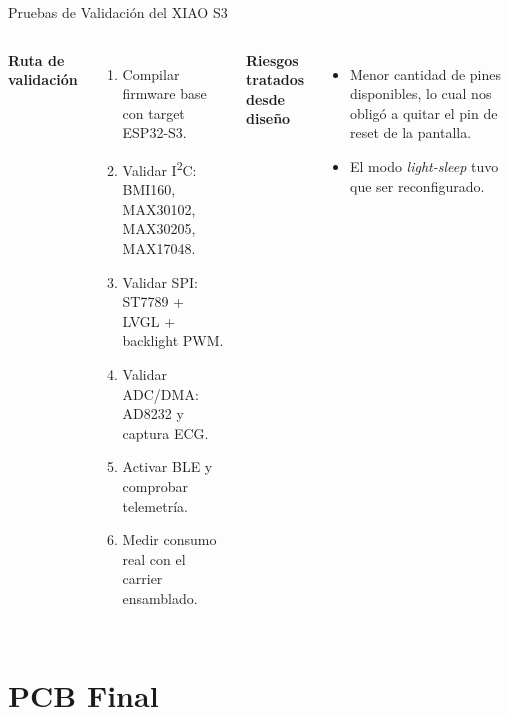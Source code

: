\documentclass[aspectratio=169, 10pt]{beamer}
\begin{document}
\begin{frame}{Pruebas de Validación del XIAO S3}
    \begin{columns}[T]
        \footnotesize
        \textbf{Ruta de validaci\'on}
        \begin{enumerate}\itemsep0.12cm
            \item Compilar firmware base con target ESP32-S3.
            \item Validar I\textsuperscript{2}C: BMI160, MAX30102, MAX30205, MAX17048.
            \item Validar SPI: ST7789 + LVGL + backlight PWM.
            \item Validar ADC/DMA: AD8232 y captura ECG.
            \item Activar BLE y comprobar telemetr\'ia.
            \item Medir consumo real con el carrier ensamblado.
        \end{enumerate}
        \footnotesize
        \textbf{Riesgos tratados desde dise\~no}
        \begin{itemize}\itemsep0.12cm
            \item Menor cantidad de pines disponibles, lo cual nos obligó a quitar el pin de reset de la pantalla.
            \item El modo \textit{light-sleep} tuvo que ser reconfigurado.
        \end{itemize}
    \end{columns}
\end{frame}

\section{PCB Final}
\end{document}
